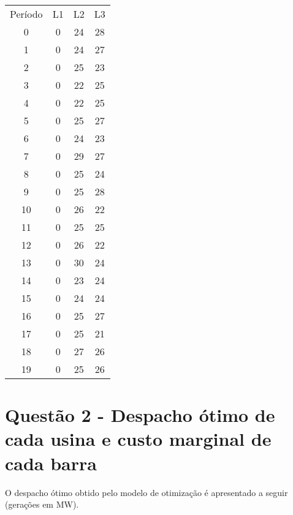 \documentclass[a4paper,12pt,twoside]{article}
\begin{document}
\begin{center}
    \begin{tabular}{ c c c c }
        Período & L1 & L2 & L3 \\
        0  & 0 & 24 & 28 \\
        1  & 0 & 24 & 27 \\
        2  & 0 & 25 & 23 \\
        3  & 0 & 22 & 25 \\
        4  & 0 & 22 & 25 \\
        5  & 0 & 25 & 27 \\
        6  & 0 & 24 & 23 \\
        7  & 0 & 29 & 27 \\
        8  & 0 & 25 & 24 \\
        9  & 0 & 25 & 28 \\
        10 & 0 & 26 & 22 \\
        11 & 0 & 25 & 25 \\
        12 & 0 & 26 & 22 \\
        13 & 0 & 30 & 24 \\
        14 & 0 & 23 & 24 \\
        15 & 0 & 24 & 24 \\
        16 & 0 & 25 & 27 \\
        17 & 0 & 25 & 21 \\
        18 & 0 & 27 & 26 \\
        19 & 0 & 25 & 26
    \end{tabular}
\end{center}

\newpage
\section{Questão 2 - Despacho ótimo de cada usina e custo marginal de cada barra}
O despacho ótimo obtido pelo modelo de otimização é apresentado a seguir (gerações em MW).
\end{document}
